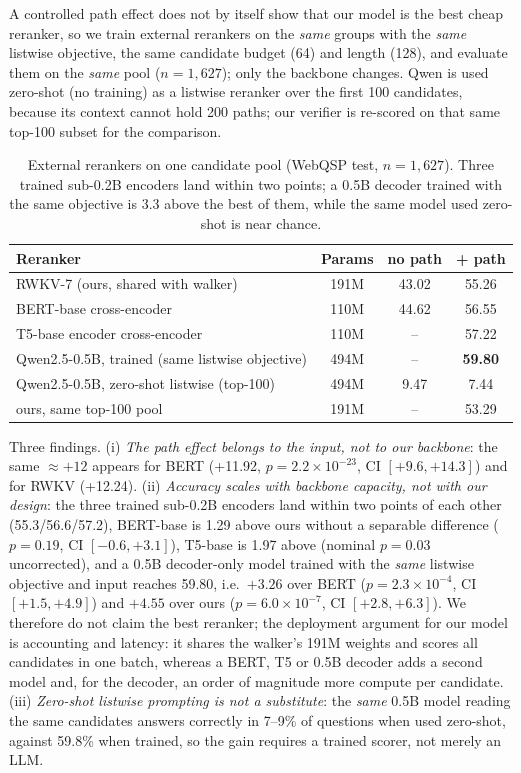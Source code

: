 \documentclass[sigconf,review,anonymous]{acmart}
\begin{document}
A controlled path effect does not by itself show that our model is the best cheap reranker, so we train external rerankers on the \emph{same} groups with the \emph{same} listwise objective, the same candidate budget (64) and length (128), and evaluate them on the \emph{same} pool ($n=1{,}627$); only the backbone changes. Qwen is used zero-shot (no training) as a listwise reranker over the first 100 candidates, because its context cannot hold 200 paths; our verifier is re-scored on that same top-100 subset for the comparison.

\begin{table}[t]
\centering\footnotesize
\caption{External rerankers on one candidate pool (WebQSP test, $n=1{,}627$). Three trained sub-0.2B encoders land within two points; a 0.5B decoder trained with the same objective is 3.3 above the best of them, while the same model used zero-shot is near chance.}
\label{tab:external}
\begin{tabular}{lccc}
\toprule
Reranker & Params & no path & + path \\
\midrule
RWKV-7 (ours, shared with walker) & 191M & 43.02 & 55.26 \\
BERT-base cross-encoder & 110M & 44.62 & 56.55 \\
T5-base encoder cross-encoder & 110M & -- & 57.22 \\
Qwen2.5-0.5B, trained (same listwise objective) & 494M & -- & \textbf{59.80} \\
Qwen2.5-0.5B, zero-shot listwise (top-100) & 494M & 9.47 & 7.44 \\
\quad ours, same top-100 pool & 191M & -- & 53.29 \\
\bottomrule
\end{tabular}
\end{table}

Three findings. (i) \emph{The path effect belongs to the input, not to our backbone}: the same $\approx+12$ appears for BERT (+11.92, $p=2.2\times10^{-23}$, CI $[+9.6,+14.3]$) and for RWKV (+12.24). (ii) \emph{Accuracy scales with backbone capacity, not with our design}: the three trained sub-0.2B encoders land within two points of each other (55.3/56.6/57.2), BERT-base is 1.29 above ours without a separable difference ($p=0.19$, CI $[-0.6,+3.1]$), T5-base is 1.97 above (nominal $p=0.03$ uncorrected), and a 0.5B decoder-only model trained with the \emph{same} listwise objective and input reaches 59.80, i.e.\ $+3.26$ over BERT ($p=2.3\times10^{-4}$, CI $[+1.5,+4.9]$) and $+4.55$ over ours ($p=6.0\times10^{-7}$, CI $[+2.8,+6.3]$). We therefore do not claim the best reranker; the deployment argument for our model is accounting and latency: it shares the walker's 191M weights and scores all candidates in one batch, whereas a BERT, T5 or 0.5B decoder adds a second model and, for the decoder, an order of magnitude more compute per candidate. (iii) \emph{Zero-shot listwise prompting is not a substitute}: the \emph{same} 0.5B model reading the same candidates answers correctly in 7--9\% of questions when used zero-shot, against 59.8\% when trained, so the gain requires a trained scorer, not merely an LLM.
\end{document}
